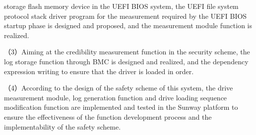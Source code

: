 \begin{eabstract}
storage flash memory device in the UEFI BIOS system, the UEFI file system protocol stack driver 
program for the measurement required by the UEFI BIOS startup phase is designed and proposed, and 
the measurement module function is realized.
\par （3）Aiming at the credibility measurement function in the security scheme, the log storage 
function through BMC is designed and realized, and the dependency expression writing to ensure that 
the driver is loaded in order.
\par （4）According to the design of the safety scheme of this system, the drive measurement module, 
log generation function and drive loading sequence modification function are implemented and 
tested in the Sunway platform to ensure the effectiveness of the function development process 
and the implementability of the safety scheme.

\end{eabstract}

